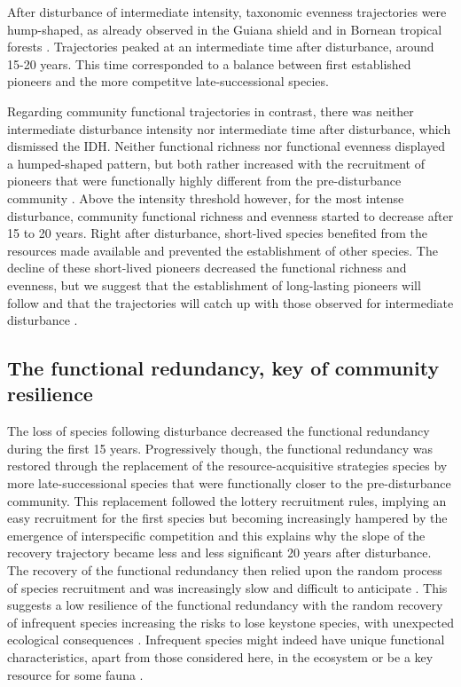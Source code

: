 \documentclass[fleqn,10pt]{ArtEcoFoG} %
\begin{document}
After disturbance of intermediate intensity, taxonomic evenness
trajectories were hump-shaped, as already observed in the Guiana shield
\citep{Baraloto2012a} and in Bornean tropical forests
\citep{Cannon1998}. Trajectories peaked at an intermediate time after
disturbance, around 15-20 years. This time corresponded to a balance
between first established pioneers and the more competitve
late-successional species.

Regarding community functional trajectories in contrast, there was
neither intermediate disturbance intensity nor intermediate time after
disturbance, which dismissed the IDH. Neither functional richness nor
functional evenness displayed a humped-shaped pattern, but both rather
increased with the recruitment of pioneers that were functionally highly
different from the pre-disturbance community
\citep{Denslow1980, Molino2001}. Above the intensity threshold however,
for the most intense disturbance, community functional richness and
evenness started to decrease after 15 to 20 years. Right after
disturbance, short-lived species benefited from the resources made
available and prevented the establishment of other species. The decline
of these short-lived pioneers decreased the functional richness and
evenness, but we suggest that the establishment of long-lasting pioneers
will follow and that the trajectories will catch up with those observed
for intermediate disturbance \citep{Walker2009}.

\subsection{The functional redundancy, key of community
resilience}\label{the-functional-redundancy-key-of-community-resilience}

The loss of species following disturbance decreased the functional
redundancy during the first 15 years. Progressively though, the
functional redundancy was restored through the replacement of the
resource-acquisitive strategies species by more late-successional
species that were functionally closer to the pre-disturbance community.
This replacement followed the lottery recruitment rules, implying an
easy recruitment for the first species but becoming increasingly
hampered by the emergence of interspecific competition
\citep{Busing2002} and this explains why the slope of the recovery
trajectory became less and less significant 20 years after disturbance.
The recovery of the functional redundancy then relied upon the random
process of species recruitment and was increasingly slow and difficult
to anticipate \citep{Elmqvist2003, Diaz2005}. This suggests a low
resilience of the functional redundancy with the random recovery of
infrequent species increasing the risks to lose keystone species, with
unexpected ecological consequences
\citep{Jones1994, Chazdon2003a, Diaz2005}. Infrequent species might
indeed have unique functional characteristics, apart from those
considered here, in the ecosystem or be a key resource for some fauna
\citep{Schleuning2016}.
\end{document}
